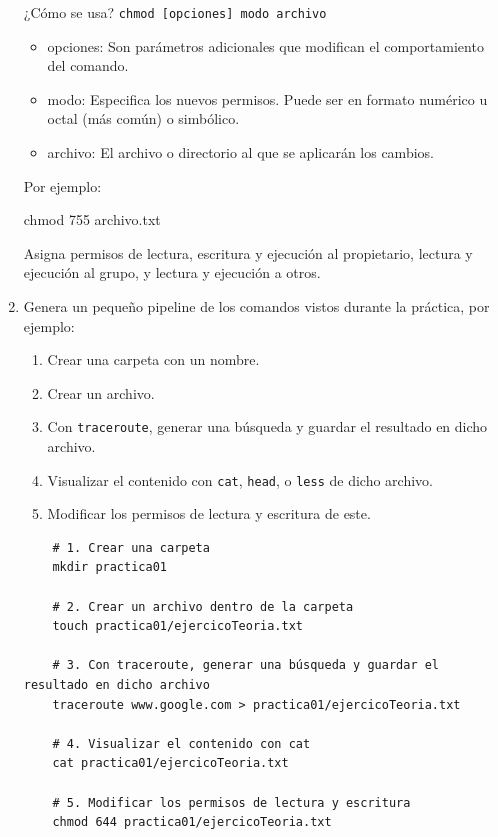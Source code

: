 \begin{enumerate}
    ¿Cómo se usa? \texttt{chmod [opciones] modo archivo}


    \begin{itemize}
        \item opciones: Son parámetros adicionales que modifican el comportamiento del comando.
        \item modo: Especifica los nuevos permisos. Puede ser en formato numérico u octal (más común) o simbólico.
        \item archivo: El archivo o directorio al que se aplicarán los cambios.
    \end{itemize}
    
    Por ejemplo:
    \begin{center}
        chmod 755 archivo.txt    
    \end{center}

    Asigna permisos de lectura, escritura y ejecución al propietario, lectura y ejecución al grupo, y 
    lectura y ejecución a otros.


    \item Genera un pequeño pipeline de los comandos vistos durante la práctica, por ejemplo:
    \begin{enumerate}
        \item Crear una carpeta con un nombre.
        \item Crear un archivo.
        \item Con \texttt{traceroute}, generar una búsqueda y guardar el resultado en dicho archivo.
        \item Visualizar el contenido con \texttt{cat}, \texttt{head}, o \texttt{less} de dicho archivo.
        \item Modificar los permisos de lectura y escritura de este.
    \end{enumerate}
    
\begin{verbatim}
    # 1. Crear una carpeta 
    mkdir practica01
    
    # 2. Crear un archivo dentro de la carpeta
    touch practica01/ejercicoTeoria.txt
    
    # 3. Con traceroute, generar una búsqueda y guardar el resultado en dicho archivo
    traceroute www.google.com > practica01/ejercicoTeoria.txt
    
    # 4. Visualizar el contenido con cat
    cat practica01/ejercicoTeoria.txt    
    
    # 5. Modificar los permisos de lectura y escritura
    chmod 644 practica01/ejercicoTeoria.txt


\end{verbatim}
\end{enumerate}
